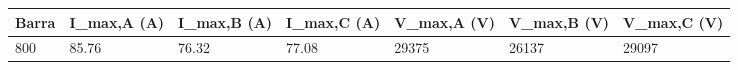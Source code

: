 \begin{tabular}{lllllll}
\toprule
Barra & I_{max,A} (A) & I_{max,B} (A) & I_{max,C} (A) & V_{max,A} (V) & V_{max,B} (V) & V_{max,C} (V) \\
\midrule
800 & 85.76 & 76.32 & 77.08 & 29375 & 26137 & 29097 \\
\bottomrule
\end{tabular}
